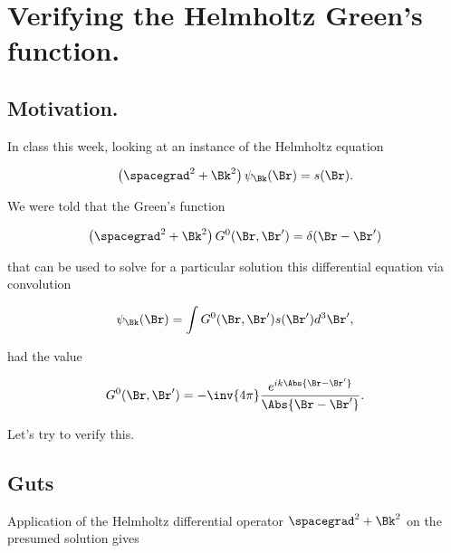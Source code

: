 
%

\chapter{Verifying the Helmholtz Green's function.}
\label{chap:helmholtzGreens}
{}
\date{Dec 12, 2011}

\beginArtWithToc

\section{Motivation.}

In class this week, looking at an instance of the Helmholtz equation

\begin{equation}\label{eqn:helmholtzGreens:10}
\left( \spacegrad^2 + \Bk^2\right) \psi_\Bk(\Br) = s(\Br).
\end{equation}

We were told that the Green's function

\begin{equation}\label{eqn:helmholtzGreens:30}
\left( \spacegrad^2 + \Bk^2\right) G^0(\Br, \Br') = \delta(\Br- \Br')
\end{equation}

that can be used to solve for a particular solution this differential equation via convolution

\begin{equation}\label{eqn:helmholtzGreens:50}
\psi_\Bk(\Br) = \int G^0(\Br, \Br') s(\Br') d^3 \Br',
\end{equation}

had the value

\begin{equation}\label{eqn:helmholtzGreens:70}
G^0(\Br, \Br') = - \inv{4 \pi} \frac{e^{i k \Abs{\Br - \Br'}} }{\Abs{\Br - \Br'}}.
\end{equation}

Let's try to verify this.

\section{Guts}

Application of the Helmholtz differential operator $\spacegrad^2 + \Bk^2$ on the presumed solution gives

